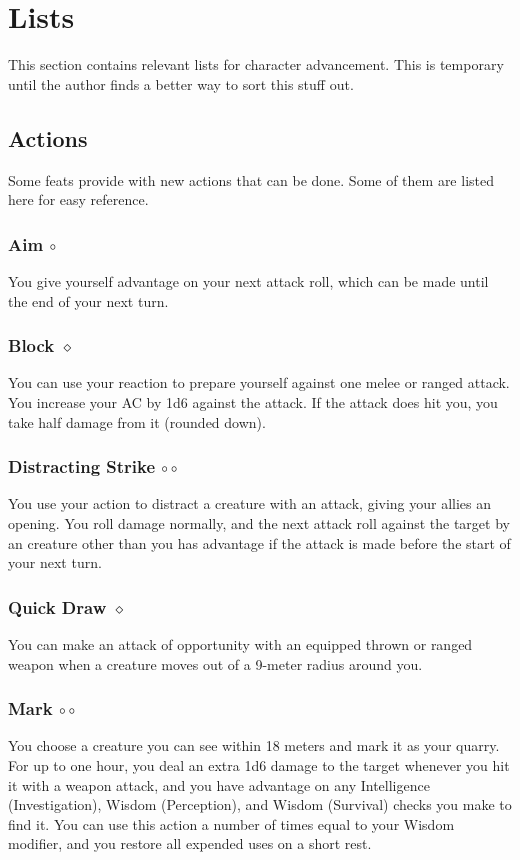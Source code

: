\section{Lists} %
This section contains relevant lists for character advancement.
This is temporary until the author finds a better way to sort this stuff out.

\subsection*{Actions} \label{ssec::actions}
    Some feats provide with new actions that can be done.
    Some of them are listed here for easy reference.

    \subsubsection{Aim $\circ$} \label{act::aim}
    You give yourself advantage on your next attack roll, which can be made until the end of your next turn.
    \subsubsection{Block $\diamond$} \label{act::block}
    You can use your reaction to prepare yourself against one melee or ranged attack.
    You increase your AC by 1d6 against the attack.
    If the attack does hit you, you take half damage from it (rounded down).
    \subsubsection{Distracting Strike $\circ\circ$} \label{act::distractingstrike}
    You use your action to distract a creature with an attack, giving your allies an opening.
    You roll damage normally, and the next attack roll against the target by an creature other than you has advantage if the attack is made before the start of your next turn.
    \subsubsection{Quick Draw $\diamond$} \label{act::quickdraw}
    You can make an attack of opportunity with an equipped thrown or ranged weapon when a creature moves out of a 9-meter radius around you.
    \subsubsection{Mark $\circ\circ$} \label{act::mark}
    You choose a creature you can see within 18 meters and mark it as your quarry.
    For up to one hour, you deal an extra 1d6 damage to the target whenever you hit it with a weapon attack, and you have advantage on any Intelligence (Investigation), Wisdom (Perception), and Wisdom (Survival) checks you make to find it.
    You can use this action a number of times equal to your Wisdom modifier, and you restore all expended uses on a short rest.
